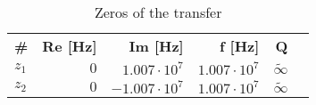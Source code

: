 \begin{table}[H]
\centering
\begin{tabular}[c]{lrrrrr}
\textbf{\#} & \textbf{Re [Hz]} & \textbf{Im [Hz]} & \textbf{f [Hz]} & \textbf{Q} \\ 
\rowcolor{myyellow}
$z_{1}$ &$0$ &$1.007 \cdot 10^{7}$ &$1.007 \cdot 10^{7}$ &$\tilde{\infty}$ \\ 
$z_{2}$ &$0$ &$-1.007 \cdot 10^{7}$ &$1.007 \cdot 10^{7}$ &$\tilde{\infty}$ \\ 
\end{tabular}
\caption{Zeros of the transfer}
\label{tab-zeros}
\end{table}

